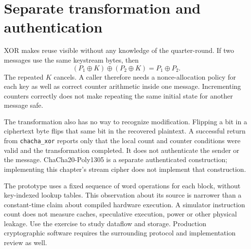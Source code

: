\section{Separate transformation and authentication}
XOR makes reuse visible without any knowledge of the quarter-round. If two messages
use the same keystream bytes, then
\[
  (P_1\oplus K)\oplus(P_2\oplus K)=P_1\oplus P_2.
\]
The repeated \(K\) cancels. A caller therefore needs a nonce-allocation policy for
each key as well as correct counter arithmetic inside one message. Incrementing
counters correctly does not make repeating the same initial state for another
message safe.

The transformation also has no way to recognize modification. Flipping a bit in a
ciphertext byte flips that same bit in the recovered plaintext. A successful return
from \texttt{chacha\_xor} reports only that the local count and counter conditions
were valid and the transformation completed. It does not authenticate the sender or
the message. ChaCha20-Poly1305 is a separate authenticated construction; implementing
this chapter's stream cipher does not implement that construction.

The prototype uses a fixed sequence of word operations for each block, without
key-indexed lookup tables. This observation about its source is narrower than a
constant-time claim about compiled hardware execution. A simulator instruction count
does not measure caches, speculative execution, power or other physical leakage.
Use the exercise to study dataflow and storage. Production cryptographic software
requires the surrounding protocol and implementation review as well.
